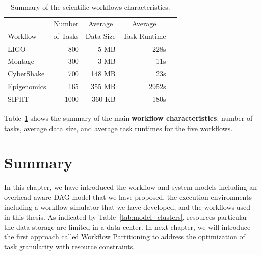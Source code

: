 \begin{table}[!htb]
	\setlength{\tabcolsep}{11pt}
	\centering
	\small
	\begin{tabular}{lrrrr}
		\hline
		 & \multicolumn{1}{c}{Number} & \multicolumn{1}{c}{Average} &  \multicolumn{1}{c}{Average} \\
		Workflow	& of Tasks	 & Data Size & Task Runtime \\
		\hline
		LIGO 		&800		& 5 MB	& 228s\\
		Montage 		&300		&3 MB	&11s\\
		CyberShake 	&700		&148 MB 	& 23s\\
		Epigenomics 	&165 	& 355 MB	& 2952s\\
		SIPHT		&1000	& 360 KB 	& 180s\\
		\hline
	\end{tabular}
	\caption{Summary of the scientific workflows characteristics.}
	\label{tab:model_workflows}
\end{table} 

Table~\ref{tab:model_workflows} shows the summary of the main \textbf{workflow characteristics}: number of tasks, average data size, and average task runtimes for the five workflows. 

\section{Summary}

In this chapter, we have introduced the workflow and system models including an overhead aware DAG model that we have proposed, the execution environments including a workflow simulator that we have developed, and the workflows used in this thesis. As indicated by Table~\ref{tab:model_clusters}, resources particular the data storage are limited in a data center. In next chapter, we will introduce the first approach called Workflow Partitioning to address the optimization of task granularity with resource constraints. 
